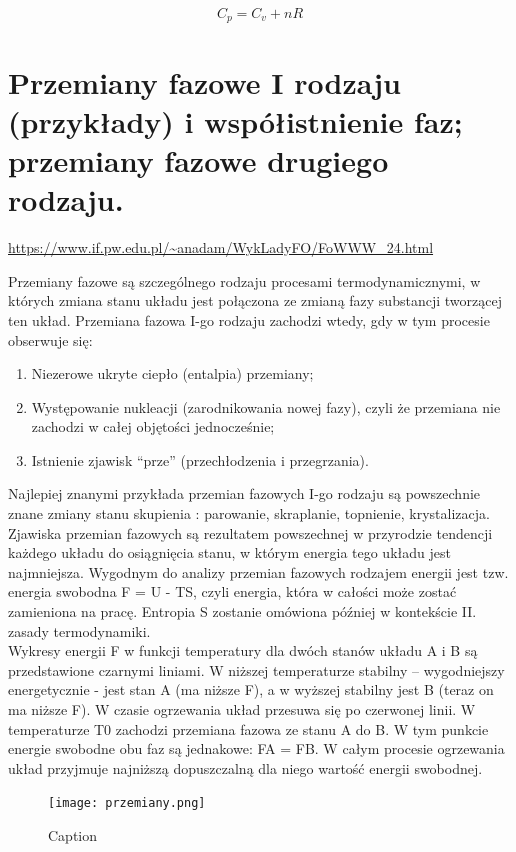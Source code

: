 \documentclass{article}
\begin{document}
\begin{equation*}
    C_p=C_v+nR
\end{equation*}
 


\section{Przemiany fazowe I rodzaju (przykłady) i współistnienie faz; przemiany fazowe drugiego rodzaju.}

\url{https://www.if.pw.edu.pl/~anadam/WykLadyFO/FoWWW_24.html}

Przemiany fazowe są szczególnego rodzaju procesami termodynamicznymi, w których zmiana stanu układu jest połączona ze zmianą fazy substancji tworzącej ten układ. Przemiana fazowa I-go rodzaju zachodzi wtedy, gdy w tym procesie obserwuje się:
\begin{enumerate}
    \item Niezerowe ukryte ciepło (entalpia) przemiany;
    \item Występowanie nukleacji (zarodnikowania nowej fazy), czyli że przemiana nie zachodzi w całej objętości jednocześnie;
    \item Istnienie zjawisk “prze” (przechłodzenia i przegrzania).
\end{enumerate}

Najlepiej znanymi przykłada przemian fazowych I-go rodzaju są powszechnie znane zmiany stanu skupienia : parowanie, skraplanie, topnienie, krystalizacja. Zjawiska przemian fazowych są rezultatem powszechnej w przyrodzie tendencji każdego układu do osiągnięcia stanu, w którym energia tego układu jest najmniejsza. Wygodnym do analizy przemian fazowych rodzajem energii jest tzw. energia swobodna F = U - TS, czyli energia, która w całości może zostać zamieniona na pracę. Entropia S zostanie omówiona później w kontekście II. zasady termodynamiki. \\

Wykresy energii F w funkcji temperatury dla dwóch stanów układu A i B są przedstawione czarnymi liniami. W niższej temperaturze stabilny – wygodniejszy energetycznie - jest stan A (ma niższe F), a w wyższej stabilny jest B (teraz on ma niższe F). W czasie ogrzewania układ przesuwa się po czerwonej linii. W temperaturze T0 zachodzi przemiana fazowa ze stanu A do B. W tym punkcie energie swobodne obu faz są jednakowe: FA = FB. W całym procesie ogrzewania układ przyjmuje najniższą dopuszczalną dla niego wartość energii swobodnej.
\begin{figure}[H]
    \centering
    \texttt{[image: przemiany.png]}
    \caption{Caption}
    \label{fig:26}
\end{figure}
 
\end{document}
